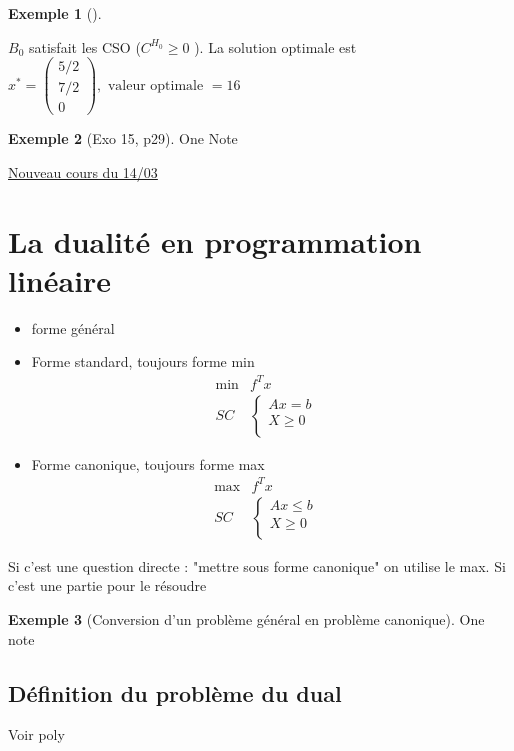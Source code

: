 \documentclass{article}
\theoremstyle{plain}%
\theoremstyle{definition}
\newtheorem{exmp}{Exemple}[section]
\theoremstyle{remark}
\begin{document}
\begin{exmp}[]
\begin{enumerate}
        $ B_0 $ satisfait les CSO ($ C^{H_0} \geq 0$ ). La solution optimale est $ x^* = \begin{pmatrix}
            5/2 \\
            7/2 \\
            0 
        \end{pmatrix}, \text{ valeur optimale } = 16 $
    \end{enumerate}
\end{exmp}

\begin{exmp}[Exo 15, p29]
    One Note
\end{exmp}

\underline{Nouveau cours du 14/03} \\

\section{La dualité en programmation linéaire}
\begin{itemize}
    \item forme général
    \item Forme standard, toujours forme min \begin{align*}
            \min& f^Tx \\
        SC& \begin{cases}
        Ax = b &\\
        X \geq 0 &\\
        \end{cases} 
    \end{align*}
    \item Forme canonique, toujours forme max \begin{align*}
            \max& f^Tx \\
        SC& \begin{cases}
        Ax \leq b &\\
        X \geq 0 &\\
        \end{cases} 
    \end{align*}
\end{itemize}
Si c'est une question directe : "mettre sous forme canonique" on utilise le max. Si c'est une partie pour le résoudre 

\begin{exmp}[Conversion d'un problème général en problème canonique]
    One note
\end{exmp}

\subsection{Définition du problème du dual}
Voir poly 
\end{document}
